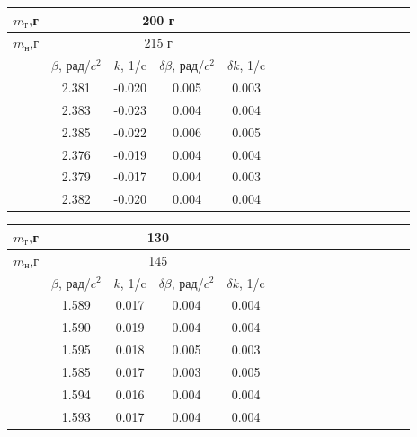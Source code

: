 \documentclass[14pt]{article}
\begin{document}
\begin{center}
\begin{tabular}{|c|c|c|c|c|c|c|c|c|c|c|c|c|c|c|c|}
\hline
$m_\text{г}$,г	&\multicolumn{4}{|c|}{200 г}			\\
\hline
$m_\text{н}$,г	&\multicolumn{4}{|c|}{215 г}		\\
\hline
				&	$\beta$, рад/$c^2$		&	$k$, 1/c		&	$\delta\beta$, рад/$c^2$		&	$\delta k$, 1/c			\\
\hline
				&	2.381					&	-0.020			&	0.005							&	0.003					\\
\hline
				&	2.383					&	-0.023			&	0.004							&	0.004					\\
\hline
				&	2.385					&	-0.022			&	0.006							&	0.005					\\
\hline
				&	2.376					&	-0.019			&	0.004							&	0.004					\\
\hline
				&	2.379					&	-0.017			&	0.004							&	0.003					\\
\hline
				&	2.382					&	-0.020			&	0.004							&	0.004					\\
\hline
\end{tabular}
\end{center}

\begin{center}
\begin{tabular}{|c|c|c|c|c|c|c|c|c|c|c|c|c|c|c|c|}
\hline
$m_\text{г}$,г	&\multicolumn{4}{|c|}{130}			\\
\hline
$m_\text{н}$,г	&\multicolumn{4}{|c|}{145}		\\
\hline
				&	$\beta$, рад/$c^2$		&	$k$, 1/c		&	$\delta\beta$, рад/$c^2$		&	$\delta k$, 1/c			\\
\hline
				&	1.589					&	0.017			&	0.004							&	0.004					\\
\hline
				&	1.590					&	0.019			&	0.004							&	0.004					\\
\hline
				&	1.595					&	0.018			&	0.005							&	0.003					\\
\hline
				&	1.585					&	0.017			&	0.003							&	0.005					\\
\hline
				&	1.594					&	0.016			&	0.004							&	0.004					\\
\hline
				&	1.593					&	0.017			&	0.004							&	0.004					\\
\hline
\end{tabular}
\end{center}
\end{document}
